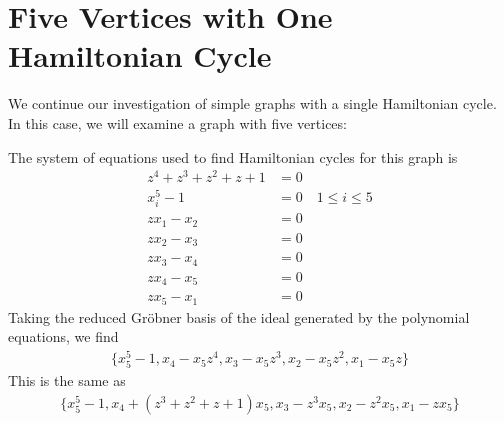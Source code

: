 \documentclass[letterpaper]{article}
\newcommand{\aln}[1]{\begin{align*} #1 \end{align*}} %
\begin{document}
\newpage

\section{Five Vertices with One Hamiltonian Cycle}
We continue our investigation of simple graphs with a single Hamiltonian cycle. In this case, we will examine a graph with five vertices:
\begin{center}
\end{center}
The system of equations used to find Hamiltonian cycles for this graph is
\aln{
  z^4 + z^3 + z^2 + z + 1 &= 0\\
  x_i^5 - 1 &= 0 \quad 1 \leq i \leq 5\\
  z x_1 - x_2 &= 0\\
  z x_2 - x_3 &= 0\\
  z x_3 - x_4 &= 0\\
  z x_4 - x_5 &= 0\\
  z x_5 - x_1 &= 0
}
Taking the reduced Gr\"obner basis of the ideal generated by the polynomial equations, we find
\aln{
  \{x_5^5-1, x_4-x_5z^4, x_3-x_5z^3, x_2-x_5z^2, x_1-x_5z\}
}
This is the same as
\aln{
  \{x_5^5-1, x_4+(z^3+z^2+z+1)x_5, x_3-z^3x_5, x_2-z^2x_5, x_1-zx_5\}
}

\newpage
\end{document}
